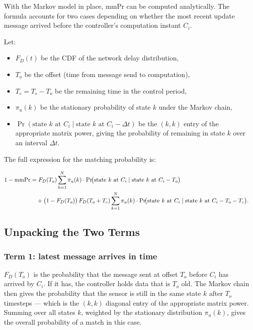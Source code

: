 With the Markov model in place, $\mathrm{mmPr}$ can be computed analytically.
The formula accounts for two cases depending on whether the most recent
update message arrived before the controller's computation instant $C_i$.
 
Let:
\begin{itemize}[leftmargin=2em]
  \item $F_D(t)$ be the CDF of the network delay distribution,
  \item $T_o$ be the offset (time from message send to computation),
  \item $T_c = T_s - T_o$ be the remaining time in the control period,
  \item $\pi_u(k)$ be the stationary probability of state $k$ under the
        Markov chain,
  \item $\Pr(\text{state } k \text{ at } C_i \mid \text{state } k \text{ at }
        C_i - \Delta t)$ be the $(k,k)$ entry of the appropriate matrix
        power, giving the probability of remaining in state $k$ over an
        interval $\Delta t$.
\end{itemize}
 
The full expression for the matching probability is:
 
\begin{align}
  1 - \mathrm{mmPr}
  &= F_D(T_o) \sum_{k=1}^{N} \pi_u(k) \cdot
     \Pr\!\bigl(\text{state } k \text{ at } C_i
               \mid \text{state } k \text{ at } C_i - T_o\bigr)
  \notag \\
  &\quad + \bigl(1 - F_D(T_o)\bigr)\, F_D(T_o + T_c)
     \sum_{k=1}^{N} \pi_u(k) \cdot
     \Pr\!\bigl(\text{state } k \text{ at } C_i
               \mid \text{state } k \text{ at } C_i - T_o - T_c\bigr).
\end{align}
 
\subsection{Unpacking the Two Terms}
 
\subsubsection*{Term 1: latest message arrives in time}
 
$F_D(T_o)$ is the probability that the message sent at offset $T_o$ before
$C_i$ has arrived by $C_i$. If it has, the controller holds data that is
$T_o$ old. The Markov chain then gives the probability that the sensor is
still in the same state $k$ after $T_o$ timesteps --- which is the $(k,k)$
diagonal entry of the appropriate matrix power. Summing over all states $k$,
weighted by the stationary distribution $\pi_u(k)$, gives the overall
probability of a match in this case.
 
